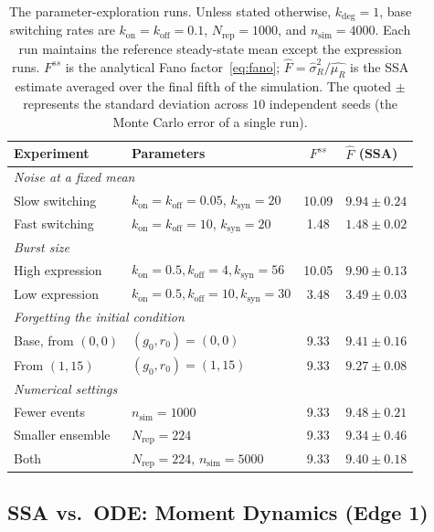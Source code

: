 \documentclass[11pt]{article}
\newcommand{\muR}{\mu_R}
\newcommand{\kon}{k_{\mathrm{on}}}
\newcommand{\koff}{k_{\mathrm{off}}}
\newcommand{\ksyn}{k_{\mathrm{syn}}}
\newcommand{\kdeg}{k_{\mathrm{deg}}}
\begin{document}
\begin{table}[htbp]
  \centering
  \small
  \begin{tabular}{llcl}
  \toprule
  \textbf{Experiment} & \textbf{Parameters} & $F^{ss}$ & $\widehat{F}$ (SSA) \\
  \midrule
  \multicolumn{4}{l}{\emph{Noise at a fixed mean}} \\
  Slow switching   & $\kon=\koff=0.05$, $\ksyn=20$   & 10.09 & $9.94\pm0.24$ \\
  Fast switching   & $\kon=\koff=10$, $\ksyn=20$     & 1.48  & $1.48\pm0.02$ \\
  \midrule
  \multicolumn{4}{l}{\emph{Burst size}} \\
  High expression  & $\kon=0.5,\koff=4,\ksyn=56$     & 10.05 & $9.90\pm0.13$ \\
  Low expression   & $\kon=0.5,\koff=10,\ksyn=30$    & 3.48  & $3.49\pm0.03$ \\
  \midrule
  \multicolumn{4}{l}{\emph{Forgetting the initial condition}} \\
  Base, from $(0,0)$   & $(g_0,r_0)=(0,0)$           & 9.33  & $9.41\pm0.16$ \\
  From $(1,15)$        & $(g_0,r_0)=(1,15)$          & 9.33  & $9.27\pm0.08$ \\
  \midrule
  \multicolumn{4}{l}{\emph{Numerical settings}} \\
  Fewer events     & $n_{\mathrm{sim}}=1000$         & 9.33  & $9.48\pm0.21$ \\
  Smaller ensemble & $N_{\mathrm{rep}}=224$          & 9.33  & $9.34\pm0.46$ \\
  Both             & $N_{\mathrm{rep}}=224,\,n_{\mathrm{sim}}=5000$ & 9.33 & $9.40\pm0.18$ \\
  \bottomrule
  \end{tabular}
  \caption{The parameter-exploration runs. Unless stated otherwise, $\kdeg=1$, base
    switching rates are $\kon=\koff=0.1$, $N_{\mathrm{rep}}=1000$, and $n_{\mathrm{sim}}=4000$. Each
    run maintains the reference steady-state mean except the expression runs. $F^{ss}$ is the analytical Fano factor~\eqref{eq:fano}; $\widehat{F}=\widehat{\sigma}_R^2/\widehat{\muR}$ is the SSA estimate averaged over the final fifth of the simulation. The quoted $\pm$ represents the standard deviation across $10$ independent seeds (the Monte Carlo error of a single run).}
  \label{tab:param-exp}
\end{table}
\subsection{SSA vs.\ ODE: Moment Dynamics (Edge 1)}
\label{sec:res-ssa-ode}
\end{document}
